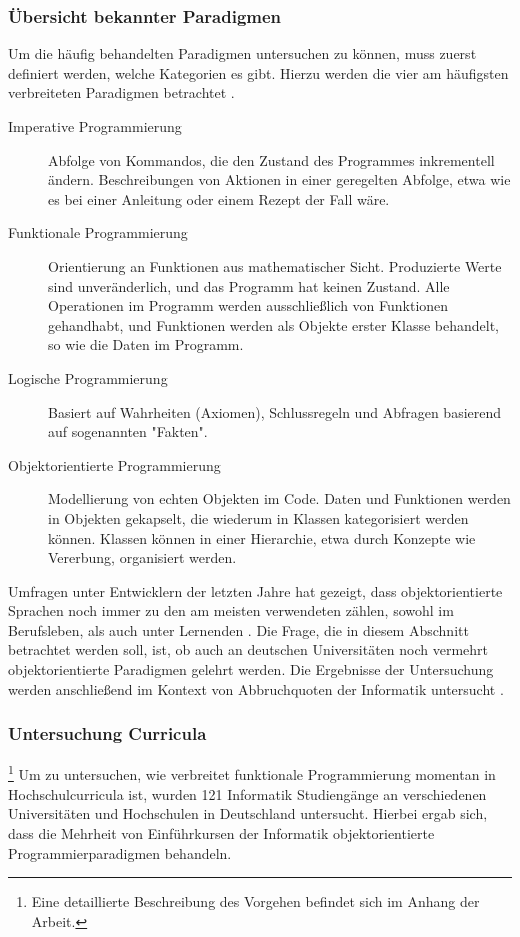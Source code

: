 \subsubsection{Übersicht bekannter Paradigmen}
Um die häufig behandelten Paradigmen untersuchen zu können, muss zuerst definiert werden, welche Kategorien es gibt. Hierzu werden die vier am häufigsten verbreiteten Paradigmen betrachtet \cite{normark}.

\begin{description}
    \item[Imperative Programmierung] Abfolge von Kommandos, die den Zustand des Programmes inkrementell ändern. Beschreibungen von Aktionen in einer geregelten Abfolge, etwa wie es bei einer Anleitung oder einem Rezept der Fall wäre.
    \item[Funktionale Programmierung] Orientierung an Funktionen aus mathematischer Sicht. Produzierte Werte sind unveränderlich, und das Programm hat keinen Zustand. Alle Operationen im Programm werden ausschließlich von Funktionen gehandhabt, und Funktionen werden als Objekte erster Klasse behandelt, so wie die Daten im Programm.
    \item[Logische Programmierung] Basiert auf Wahrheiten (Axiomen), Schlussregeln und Abfragen basierend auf sogenannten "Fakten".
    \item[Objektorientierte Programmierung] Modellierung von echten Objekten im Code. Daten und Funktionen werden in Objekten gekapselt, die wiederum in Klassen kategorisiert werden können. Klassen können in einer Hierarchie, etwa durch Konzepte wie Vererbung, organisiert werden.
\end{description}

Umfragen unter Entwicklern der letzten Jahre hat gezeigt, dass objektorientierte Sprachen noch immer zu den am meisten verwendeten zählen, sowohl im Berufsleben, als auch unter Lernenden \cite{stackoverflow}. Die Frage, die in diesem Abschnitt betrachtet werden soll, ist, ob auch an deutschen Universitäten noch vermehrt objektorientierte Paradigmen gelehrt werden.
Die Ergebnisse der Untersuchung werden anschließend im Kontext von Abbruchquoten der Informatik untersucht \cite{dhzw}.

\subsubsection{Untersuchung Curricula}
\footnote{Eine detaillierte Beschreibung des Vorgehen befindet sich im Anhang der Arbeit.}
Um zu untersuchen, wie verbreitet funktionale Programmierung momentan in Hochschulcurricula ist, wurden 121 Informatik Studiengänge an verschiedenen Universitäten und Hochschulen in Deutschland untersucht.
Hierbei ergab sich, dass die Mehrheit von Einführkursen der Informatik objektorientierte Programmierparadigmen behandeln.

